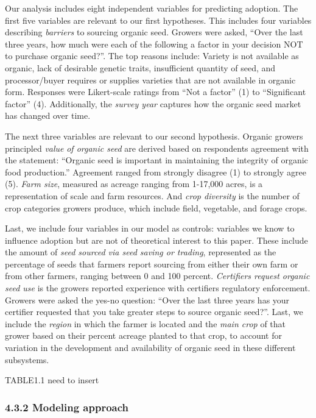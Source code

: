 \documentclass[twoside,12pt,final]{ucthesis-CA2012}
\begin{document}
\begin{ucmainmatter}
Our analysis includes eight independent variables for predicting
adoption. The first five variables are relevant to our first hypotheses.
This includes four variables describing \emph{barriers} to sourcing organic
seed. Growers were asked, ``Over the last three years, how much were
each of the following a factor in your decision NOT to purchase organic
seed?''. The top reasons include: Variety is not available as organic,
lack of desirable genetic traits, insufficient quantity of seed, and
processor/buyer requires or supplies varieties that are not available in
organic form. Responses were Likert-scale ratings from ``Not a factor''
(1) to ``Significant factor'' (4). Additionally, the \emph{survey year}
captures how the organic seed market has changed over time.

The next three variables are relevant to our second hypothesis. Organic
growers\textquotesingle{} principled \emph{value} \emph{of organic seed} are derived based on
respondents\textquotesingle{} agreement with the statement: ``Organic seed is important
in maintaining the integrity of organic food production.'' Agreement
ranged from strongly disagree (1) to strongly agree (5). \emph{Farm size},
measured as acreage ranging from 1-17,000 acres, is a representation of
scale and farm resources. And \emph{crop diversity} is the number of crop
categories growers produce, which include field, vegetable, and forage
crops.

Last, we include four variables in our model as controls: variables we
know to influence adoption but are not of theoretical interest to this
paper. These include the amount of \emph{seed sourced via seed saving or
trading}, represented as the percentage of seeds that farmers report
sourcing from either their own farm or from other farmers, ranging
between 0 and 100 percent. \emph{Certifiers request organic seed use} is the
growers\textquotesingle{} reported experience with certifiers\textquotesingle{} regulatory enforcement.
Growers were asked the yes-no question: ``Over the last three years has
your certifier requested that you take greater steps to source organic
seed?''. Last, we include the \emph{region} in which the farmer is located
and the \emph{main crop} of that grower based on their percent acreage
planted to that crop, to account for variation in the development and
availability of organic seed in these different subsystems.

TABLE1.1 need to insert

\hypertarget{modeling-approach}{%
\subsubsection{4.3.2 Modeling approach}\label{modeling-approach}}


\end{ucmainmatter}
\end{document}
